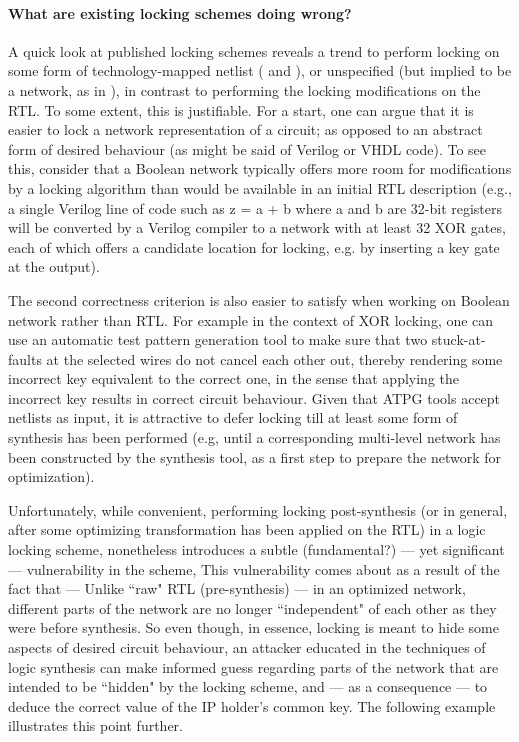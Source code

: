 \paragraph{What are existing locking schemes doing wrong?} A quick look at published locking schemes reveals a trend to perform locking on some form of technology-mapped netlist (\cite{} and \cite{}), or unspecified (but implied to be a network, as in \cite{}), in contrast to performing the locking modifications on the RTL. To some extent, this is justifiable. For a start, one can argue that it is easier to lock a network representation of a circuit; as opposed to an abstract form of desired behaviour (as might be said of Verilog or VHDL code). To see this, consider that a Boolean network typically offers more room for modifications by a locking algorithm than would be available in an initial RTL description (e.g., a single Verilog line of code such as z = a + b where a and b are 32-bit registers will be converted by a Verilog compiler to a network with at least 32 XOR gates, each of which offers a candidate location for locking, e.g. by inserting a key gate at the output). 

The second correctness criterion is also easier to satisfy when working on Boolean network rather than RTL. For example in the context of XOR locking, one can use an automatic test pattern generation tool to make sure that two stuck-at-faults at the selected wires do not cancel each other out, thereby rendering some incorrect key equivalent to the correct one, in the sense that applying the incorrect key results in correct circuit behaviour. Given that ATPG tools accept netlists as input, it is attractive to defer locking till at least some form of synthesis has been performed (e.g, until a corresponding multi-level network has been constructed by the synthesis tool, as a first step to prepare the network for optimization).


Unfortunately, while convenient, performing locking post-synthesis (or in general, after some optimizing transformation has been applied on the RTL) in a logic locking scheme, nonetheless introduces a subtle (fundamental?) --- yet significant --- vulnerability in the scheme, %
This vulnerability comes about as a result of the fact that --- Unlike ``raw" RTL (pre-synthesis) --- in an optimized network, different parts of the network are no longer ``independent" of each other as they were before synthesis. So even though, in essence, locking is meant to hide some aspects of desired circuit behaviour, an attacker educated in the techniques of logic synthesis
can make informed guess regarding parts of the network that are intended to be ``hidden" by the locking scheme, and --- as a consequence --- to deduce the correct value of the IP holder's common key. The following example illustrates this point further.

